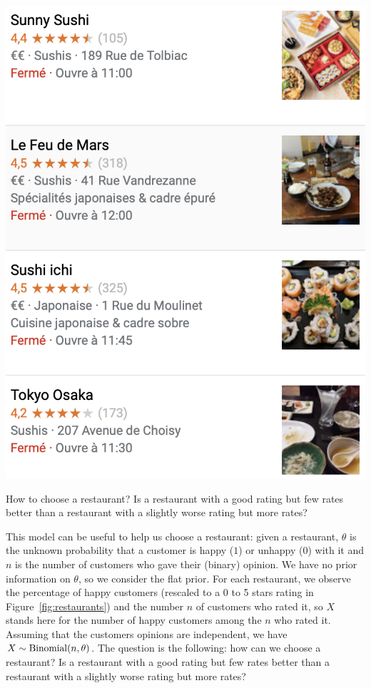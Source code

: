 \begin{marginfigure}
	\includegraphics{images/restos.png}
	\caption{How to choose a restaurant? Is a restaurant with a good rating but few rates better than a restaurant with a slightly worse rating but more rates?}
	\label{fig:restaurants}
\end{marginfigure}
This model can be useful to help us choose a restaurant: given a restaurant, $\theta$ is the unknown probability that a customer is happy ($1$) or unhappy ($0$) with it and $n$ is the number of customers who gave their (binary) opinion.
We have no prior information on $\theta$, so we consider the flat prior.
For each restaurant, we observe the percentage of happy customers (rescaled to a 0 to 5 stars rating in Figure~\ref{fig:restaurants}) and the number $n$ of customers who rated it, so $X$ stands here for the number of happy customers among the $n$ who rated it. 
Assuming that the customers opinions are independent, we have $X \sim \operatorname{Binomial}(n, \theta)$.
The question is the following: how can we choose a restaurant? Is a restaurant with a good rating but few rates better than a restaurant with a slightly worse rating but more rates?

